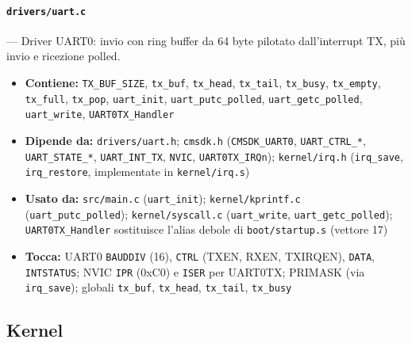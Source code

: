 \paragraph{\texttt{drivers/uart.c}} --- Driver UART0: invio con ring buffer da 64 byte pilotato dall'interrupt TX, più invio e ricezione polled.
\begin{itemize}
  \item \textbf{Contiene:} \texttt{TX\_BUF\_SIZE}, \texttt{tx\_buf}, \texttt{tx\_head}, \texttt{tx\_tail}, \texttt{tx\_busy}, \texttt{tx\_empty}, \texttt{tx\_full}, \texttt{tx\_pop}, \texttt{uart\_init}, \texttt{uart\_putc\_polled}, \texttt{uart\_getc\_polled}, \texttt{uart\_write}, \texttt{UART0TX\_Handler}
  \item \textbf{Dipende da:} \texttt{drivers/uart.h}; \texttt{cmsdk.h} (\texttt{CMSDK\_UART0}, \texttt{UART\_CTRL\_*}, \texttt{UART\_STATE\_*}, \texttt{UART\_INT\_TX}, \texttt{NVIC}, \texttt{UART0TX\_IRQn}); \texttt{kernel/irq.h} (\texttt{irq\_save}, \texttt{irq\_restore}, implementate in \texttt{kernel/irq.s})
  \item \textbf{Usato da:} \texttt{src/main.c} (\texttt{uart\_init}); \texttt{kernel/kprintf.c} (\texttt{uart\_putc\_polled}); \texttt{kernel/syscall.c} (\texttt{uart\_write}, \texttt{uart\_getc\_polled}); \texttt{UART0TX\_Handler} sostituisce l'alias debole di \texttt{boot/startup.s} (vettore 17)
  \item \textbf{Tocca:} UART0 \texttt{BAUDDIV} (16), \texttt{CTRL} (TXEN, RXEN, TXIRQEN), \texttt{DATA}, \texttt{INTSTATUS}; NVIC \texttt{IPR} (0xC0) e \texttt{ISER} per UART0TX; PRIMASK (via \texttt{irq\_save}); globali \texttt{tx\_buf}, \texttt{tx\_head}, \texttt{tx\_tail}, \texttt{tx\_busy}
\end{itemize}

\subsection{Kernel}

